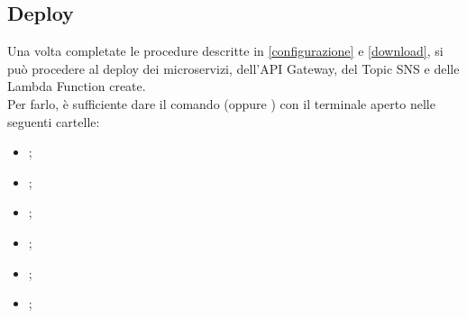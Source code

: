 \subsection{Deploy}
Una volta completate le procedure descritte in \ref{configurazione} e \ref{download}, si può procedere al deploy dei microservizi, dell'API Gateway, del Topic SNS e delle Lambda Function create.\\
Per farlo, è sufficiente dare il comando  (oppure ) con il terminale aperto nelle seguenti cartelle:
\begin{itemize}
	\item {};
	\item {};
	\item {};
	\item {};
	\item {};
	\item {};
\end{itemize}
